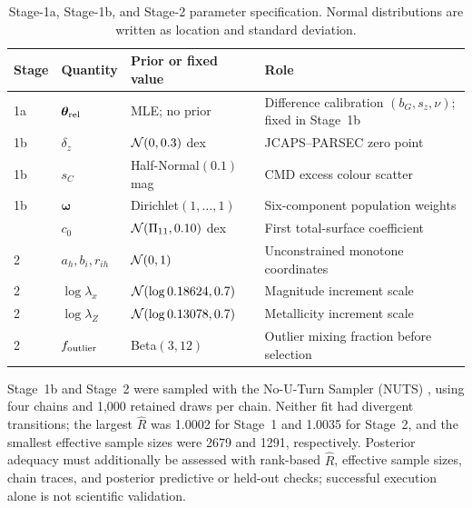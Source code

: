 \begin{table}[htbp]
\centering
\caption{Stage-1a, Stage-1b, and Stage-2 parameter specification.  Normal
distributions are written as location and standard deviation.}
\label{tab:priors}
\begin{tabularx}{\textwidth}{@{}lllX@{}}
\toprule
Stage & Quantity & Prior or fixed value & Role \\
\midrule
1a & $\bm\theta_{\rm rel}$ & MLE; no prior & Difference calibration $(b_G,s_z,\nu)$; fixed in Stage~1b \\
1b & $\delta_z$ & $\mathcal{N}(0,0.3)$ dex & JCAPS--PARSEC zero point \\
1b & $s_C$ & Half-Normal$(0.1)$ mag & CMD excess colour scatter \\
1b & $\bm\omega$ & Dirichlet$(1,\ldots,1)$ & Six-component population weights \\
\addlinespace
2 & $c_0$ & $\mathcal{N}(\Pi_{11},0.10)$ dex & First total-surface coefficient \\
2 & $a_h,b_i,r_{ih}$ & $\mathcal{N}(0,1)$ & Unconstrained monotone coordinates \\
2 & $\log\lambda_x$ & $\mathcal{N}(\log0.18624,0.7)$ & Magnitude increment scale \\
2 & $\log\lambda_Z$ & $\mathcal{N}(\log0.13078,0.7)$ & Metallicity increment scale \\
2 & $f_{\rm outlier}$ & Beta$(3,12)$ & Outlier mixing fraction before selection \\
\bottomrule
\end{tabularx}
\end{table}
\FloatBarrier

Stage~1b and Stage~2 were sampled with the No-U-Turn Sampler (NUTS)
\citep{HoffmanGelman2014NUTS}, using four chains and 1,000 retained draws per
chain.  Neither fit had divergent transitions; the largest $\widehat R$ was 1.0002 for Stage~1 and 1.0035 for Stage~2, and the smallest effective sample sizes were 2679 and 1291, respectively.  Posterior adequacy must
additionally be assessed with rank-based
$\widehat R$, effective sample sizes, chain traces, and posterior predictive or
held-out checks; successful execution alone is not scientific validation.

